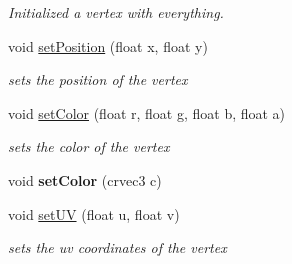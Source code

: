 \begin{DoxyCompactItemize}
\begin{DoxyCompactList}\small\item\em Initialized a vertex with everything. \end{DoxyCompactList}\item 
\mbox{\label{structnta_1_1Vertex2D_a7079a91fd386eb3e4425c965f2ce2592}} 
void \hyperlink{structnta_1_1Vertex2D_a7079a91fd386eb3e4425c965f2ce2592}{set\+Position} (float x, float y)
\begin{DoxyCompactList}\small\item\em sets the position of the vertex \end{DoxyCompactList}\item 
\mbox{\label{structnta_1_1Vertex2D_a12483720589a9836dd4628b2c2bc480c}} 
void \hyperlink{structnta_1_1Vertex2D_a12483720589a9836dd4628b2c2bc480c}{set\+Color} (float r, float g, float b, float a)
\begin{DoxyCompactList}\small\item\em sets the color of the vertex \end{DoxyCompactList}\item 
\mbox{\label{structnta_1_1Vertex2D_a353285f6dc33e239b6c1290f50db1a3a}} 
void {\bfseries set\+Color} (crvec3 c)
\item 
\mbox{\label{structnta_1_1Vertex2D_adb7b7e6498200e6f11965b0ecadeaa97}} 
void \hyperlink{structnta_1_1Vertex2D_adb7b7e6498200e6f11965b0ecadeaa97}{set\+UV} (float u, float v)
\begin{DoxyCompactList}\small\item\em sets the uv coordinates of the vertex \end{DoxyCompactList}\end{DoxyCompactItemize}
